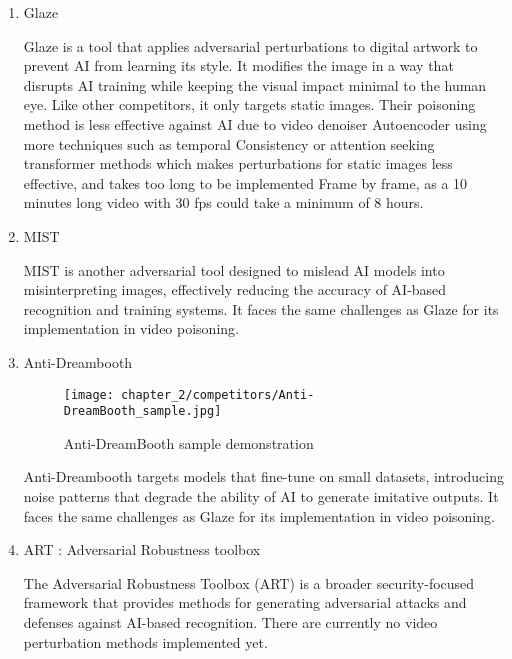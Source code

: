     \begin{enumerate}
        \item Glaze
        
        \par Glaze is a tool that applies adversarial perturbations to digital artwork to prevent AI from learning its style. It modifies the image in a way that disrupts AI training while keeping the visual impact minimal to the human eye.
        Like other competitors, it only targets static images. Their poisoning method is less effective against AI due to video denoiser Autoencoder using more techniques such as temporal Consistency or attention seeking transformer methods which makes perturbations for static images less effective, and takes too long to be implemented Frame by frame, as a 10 minutes long video with 30 fps could take a minimum of 8 hours.
        
        \item MIST
        \par MIST is another adversarial tool designed to mislead AI models into misinterpreting images, effectively reducing the accuracy of AI-based recognition and training systems. It faces the same challenges as Glaze for its implementation in video poisoning.

        
        \item Anti-Dreambooth
        \begin{figure}[h]
            \centering
            \texttt{[image: chapter\_2/competitors/Anti-DreamBooth\_sample.jpg]}
            \caption{Anti-DreamBooth sample demonstration}
        
        \end{figure}
        \par Anti-Dreambooth targets models that fine-tune on small datasets, introducing noise patterns that degrade the ability of AI to generate imitative outputs. It faces the same challenges as Glaze for its implementation in video poisoning.

        
        \item ART : Adversarial Robustness toolbox
        \par The Adversarial Robustness Toolbox (ART) is a broader security-focused framework that provides methods for generating adversarial attacks and defenses against AI-based recognition.
        There are currently no video perturbation methods implemented yet.

        
    \end{enumerate}

